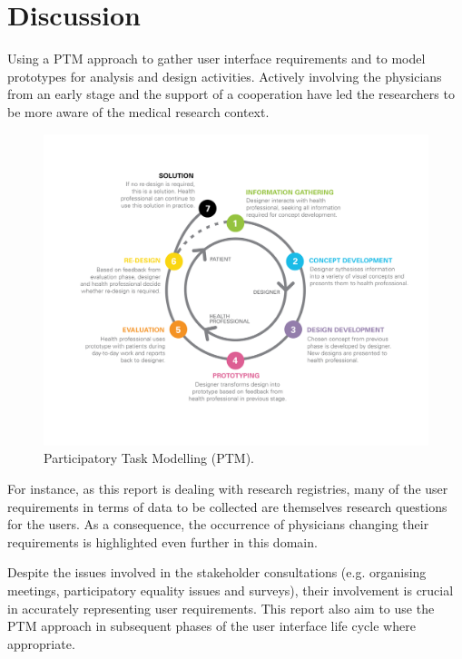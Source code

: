 \clearpage

\section{Discussion}

Using a PTM \cite{keungparticipatory} approach to gather user interface requirements and to model prototypes for analysis and design activities. Actively involving the physicians from an early stage and the support of a cooperation have led the researchers to be more aware of the medical research context.

\begin{figure}[!hbt]
\centering
\includegraphics[width=1.00\textwidth]{ptm.png}
\caption{\label{fig:PTM}Participatory Task Modelling (PTM).
}
\end{figure}

For instance, as this report is dealing with research registries, many of the user requirements in terms of data to be collected are themselves research questions for the users. As a consequence, the occurrence of physicians changing their requirements is highlighted even further in this domain.

\clearpage

Despite the issues involved in the stakeholder consultations (e.g. organising meetings, participatory equality issues and surveys), their involvement is crucial in accurately representing user requirements. This report also aim to use the PTM approach in subsequent phases of the user interface life cycle where appropriate.

